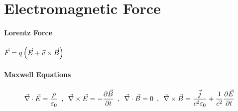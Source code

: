 \section{Electromagnetic Force}

\paragraph{Lorentz Force}
$\vec{F} = q \left( \vec{E} + \vec{v} \times \vec{B} \right)$

\paragraph{Maxwell Equations}
\begin{align*}
    \vec{\nabla} \cdot \vec{E} = \frac{\rho}{\varepsilon_0}
    \hspace{5pt} , \hspace{5pt}
    \vec{\nabla} \times \vec{E} = - \frac{\partial \vec{B}}{\partial t}
    \hspace{5pt} , \hspace{5pt}
    \vec{\nabla} \cdot \vec{B} = 0
    \hspace{5pt} , \hspace{5pt}
    \vec{\nabla} \times \vec{B} = \frac{\vec{j}}{c^2 \varepsilon_0} + \frac{1}{c^2} \frac{\partial \vec{E}}{\partial t}
\end{align*}
